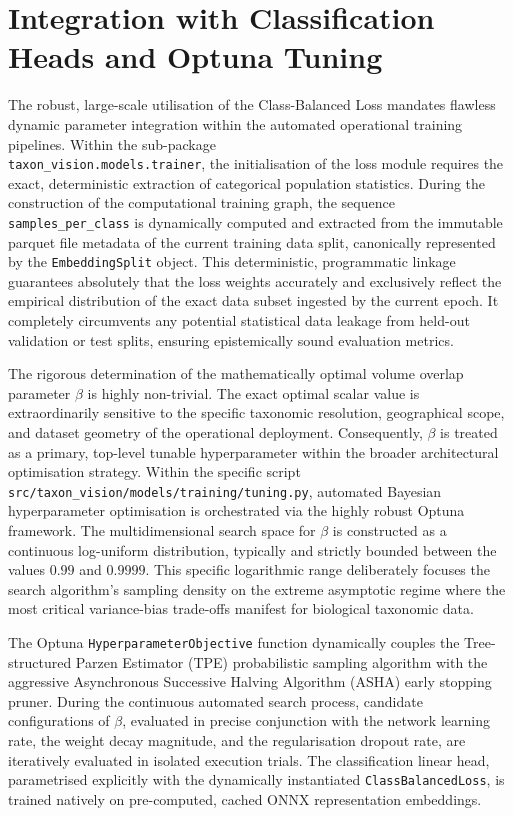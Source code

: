 \section{Integration with Classification Heads and Optuna Tuning}
\label{sec:integration_and_optuna_tuning}

The robust, large-scale utilisation of the Class-Balanced Loss mandates flawless dynamic parameter integration within the automated operational training pipelines. Within the sub-package\\\texttt{taxon\_vision.models.trainer}, the initialisation of the loss module requires the exact, deterministic extraction of categorical population statistics. During the construction of the computational training graph, the sequence \texttt{samples\_per\_class} is dynamically computed and extracted from the immutable parquet file metadata of the current training data split, canonically represented by the \texttt{EmbeddingSplit} object. This deterministic, programmatic linkage guarantees absolutely that the loss weights accurately and exclusively reflect the empirical distribution of the exact data subset ingested by the current epoch. It completely circumvents any potential statistical data leakage from held-out validation or test splits, ensuring epistemically sound evaluation metrics.

The rigorous determination of the mathematically optimal volume overlap parameter $\beta$ is highly non-trivial. The exact optimal scalar value is extraordinarily sensitive to the specific taxonomic resolution, geographical scope, and dataset geometry of the operational deployment. Consequently, $\beta$ is treated as a primary, top-level tunable hyperparameter within the broader architectural optimisation strategy. Within the specific script \texttt{src/taxon\_vision/models/training/tuning.py}, automated Bayesian hyperparameter optimisation is orchestrated via the highly robust Optuna framework. The multidimensional search space for $\beta$ is constructed as a continuous log-uniform distribution, typically and strictly bounded between the values $0.99$ and $0.9999$. This specific logarithmic range deliberately focuses the search algorithm's sampling density on the extreme asymptotic regime where the most critical variance-bias trade-offs manifest for biological taxonomic data.

The Optuna \texttt{HyperparameterObjective} function dynamically couples the Tree-structured Parzen Estimator (TPE) probabilistic sampling algorithm with the aggressive Asynchronous Successive Halving Algorithm (ASHA) early stopping pruner. During the continuous automated search process, candidate configurations of $\beta$, evaluated in precise conjunction with the network learning rate, the weight decay magnitude, and the regularisation dropout rate, are iteratively evaluated in isolated execution trials. The classification linear head, parametrised explicitly with the dynamically instantiated \texttt{ClassBalancedLoss}, is trained natively on pre-computed, cached ONNX representation embeddings.

